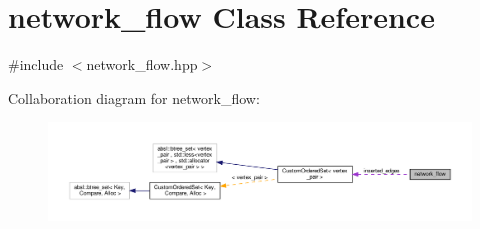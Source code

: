 \hypertarget{classnetwork__flow}{}\section{network\+\_\+flow Class Reference}
\label{classnetwork__flow}


{\ttfamily \#include $<$network\+\_\+flow.\+hpp$>$}



Collaboration diagram for network\+\_\+flow\+:
\nopagebreak
\begin{figure}[H]
\begin{center}
\leavevmode
\includegraphics[width=350pt]{d2/de2/classnetwork__flow__coll__graph}
\end{center}
\end{figure}
